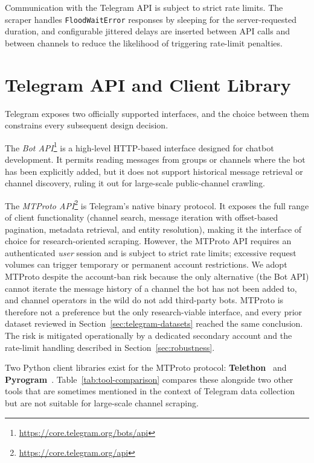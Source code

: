 Communication with the Telegram API is subject to strict rate limits.
The scraper handles \texttt{FloodWaitError} responses by sleeping for the server-requested duration, and configurable jittered delays are inserted between API calls and between channels to reduce the likelihood of triggering rate-limit penalties.

\section{Telegram API and Client Library}
\label{sec:tools}

Telegram exposes two officially supported interfaces, and the choice between them constrains every subsequent design decision.

The \emph{Bot API}\footnote{\url{https://core.telegram.org/bots/api}} is a high-level HTTP-based interface designed for chatbot development.
It permits reading messages from groups or channels where the bot has been explicitly added, but it does not support historical message retrieval or channel discovery, ruling it out for large-scale public-channel crawling.

The \emph{MTProto API}\footnote{\url{https://core.telegram.org/api}} is Telegram's native binary protocol.
It exposes the full range of client functionality (channel search, message iteration with offset-based pagination, metadata retrieval, and entity resolution), making it the interface of choice for research-oriented scraping.
However, the MTProto API requires an authenticated \emph{user} session and is subject to strict rate limits; excessive request volumes can trigger temporary or permanent account restrictions.
We adopt MTProto despite the account-ban risk because the only alternative (the Bot API) cannot iterate the message history of a channel the bot has not been added to, and channel operators in the wild do not add third-party bots. MTProto is therefore not a preference but the only research-viable interface, and every prior dataset reviewed in Section~\ref{sec:telegram-datasets} reached the same conclusion. The risk is mitigated operationally by a dedicated secondary account and the rate-limit handling described in Section~\ref{sec:robustness}.

Two Python client libraries exist for the MTProto protocol: \textbf{Telethon}~\cite{telethon2026} and \textbf{Pyrogram}~\cite{pyrogram2024}.
Table~\ref{tab:tool-comparison} compares these alongside two other tools that are sometimes mentioned in the context of Telegram data collection but are not suitable for large-scale channel scraping.

